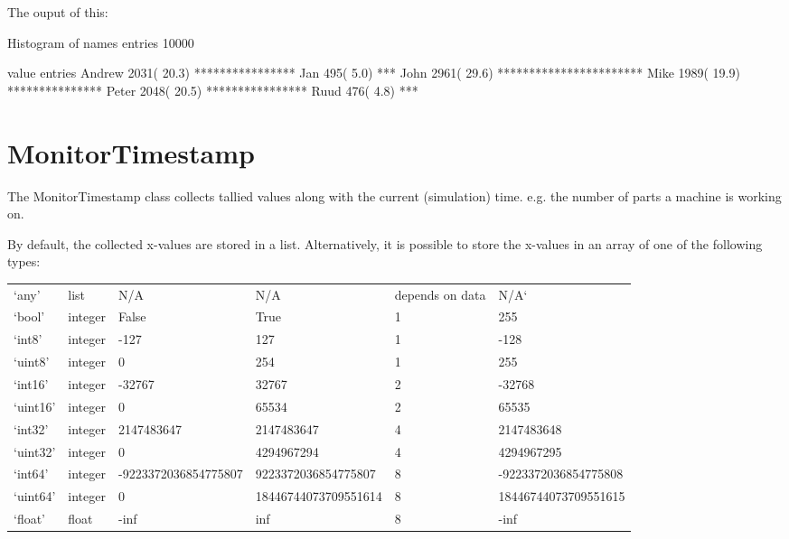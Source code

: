 \documentclass[letterpaper,10pt,english]{sphinxmanual}
\begin{document}
The ouput of this:

\begin{sphinxVerbatim}[commandchars=\\\{\}]
Histogram of names
entries          10000

value               entries
Andrew                 2031( 20.3\PYGZpc{}) ****************
Jan                     495(  5.0\PYGZpc{}) ***
John                   2961( 29.6\PYGZpc{}) ***********************
Mike                   1989( 19.9\PYGZpc{}) ***************
Peter                  2048( 20.5\PYGZpc{}) ****************
Ruud                    476(  4.8\PYGZpc{}) ***
\end{sphinxVerbatim}


\section{MonitorTimestamp}
\label{\detokenize{Monitor and MonitorTimestamp:monitortimestamp}}
The MonitorTimestamp class collects tallied values along with the current (simulation) time.
e.g. the number of parts a machine is working on.

By default, the collected x-values are stored in a list. Alternatively, it is possible to store
the x-values in an array of one of the following types:


\begin{savenotes}\sphinxattablestart
\centering
\begin{tabulary}{\linewidth}[t]{|T|T|T|T|T|T|}
\hline
{}\relax &\relax &\relax &\relax &\relax &\relax \\
\hline
‘any’
&
list
&
N/A
&
N/A
&
depends on data
&
N/A{}`
\\
\hline
‘bool’
&
integer
&
False
&
True
&
1
&
255
\\
\hline
‘int8’
&
integer
&
-127
&
127
&
1
&
-128
\\
\hline
‘uint8’
&
integer
&
0
&
254
&
1
&
255
\\
\hline
‘int16’
&
integer
&
-32767
&
32767
&
2
&
-32768
\\
\hline
‘uint16’
&
integer
&
0
&
65534
&
2
&
65535
\\
\hline
‘int32’
&
integer
&
2147483647
&
2147483647
&
4
&
2147483648
\\
\hline
‘uint32’
&
integer
&
0
&
4294967294
&
4
&
4294967295
\\
\hline
‘int64’
&
integer
&
-9223372036854775807
&
9223372036854775807
&
8
&
-9223372036854775808
\\
\hline
‘uint64’
&
integer
&
0
&
18446744073709551614
&
8
&
18446744073709551615
\\
\hline
‘float’
&
float
&
-inf
&
inf
&
8
&
-inf
\\
\hline
\end{tabulary}
\par
\sphinxattableend\end{savenotes}
\end{document}
